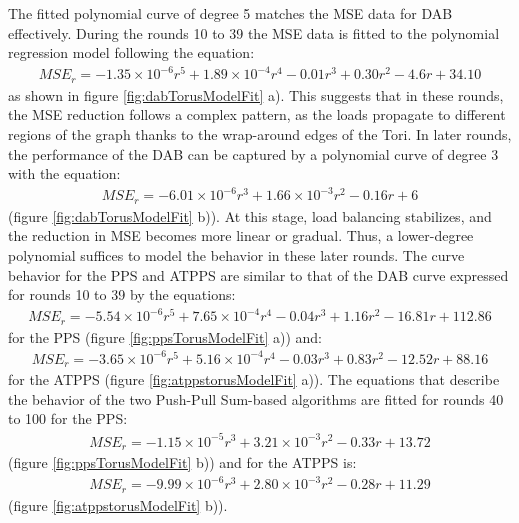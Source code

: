 The fitted polynomial curve of degree 5 matches the MSE data for DAB effectively. During the rounds 10 to 39 the MSE data is fitted to the polynomial regression model following the equation: 
\begin{align}
    MSE_r=-1.35\times 10^{-6}r^{5}+ 1.89\times 10^{-4}r^{4}-0.01r^{3}+0.30r^{2}-4.6r+34.10    
\end{align}
as shown in figure \ref{fig:dabTorusModelFit} a). This suggests that in these rounds, the MSE reduction follows a complex pattern, as the loads propagate to different regions of the graph thanks to the wrap-around edges of the Tori. In later rounds, the performance of the DAB can be captured by a polynomial curve of degree 3 with the equation:
\begin{align}
    MSE_r=-6.01\times 10^{-6}r^{3}+1.66\times 10^{-3}r^{2}-0.16r+6    
\end{align}
(figure \ref{fig:dabTorusModelFit} b)). At this stage, load balancing stabilizes, and the reduction in MSE becomes more linear or gradual. Thus, a lower-degree polynomial suffices to model the behavior in these later rounds. The curve behavior for the PPS and ATPPS are similar to that of the DAB curve expressed for rounds 10 to 39 by the equations:
\begin{align}
    MSE_r=-5.54\times 10^{-6}r^{5}+7.65\times 10^{-4}r^{4}-0.04r^{3}+1.16r^{2}-16.81r+112.86    
\end{align}
for the PPS (figure \ref{fig:ppsTorusModelFit} a)) and:
\begin{align}
    MSE_r = -3.65 \times 10^{-6}r^{5} + 5.16 \times 10^{-4}r^{4} - 0.03r^{3} + 0.83r^{2} - 12.52r + 88.16    
\end{align}
for the ATPPS (figure \ref{fig:atppstorusModelFit} a)). The equations that describe the behavior of the two Push-Pull Sum-based algorithms are fitted for rounds 40 to 100 for the PPS: 
\begin{align}
    MSE_r = -1.15 \times 10^{-5}r^{3} + 3.21\times 10^{-3}r^{2} - 0.33r + 13.72    
\end{align}
(figure \ref{fig:ppsTorusModelFit} b)) and for the ATPPS is:
\begin{align}
    MSE_r = -9.99 \times 10^{-6}r^{3} + 2.80\times 10^{-3}r^{2} - 0.28r + 11.29    
\end{align}
(figure \ref{fig:atppstorusModelFit} b)).

